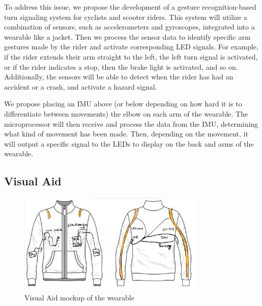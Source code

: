 \documentclass[12pt]{article}
\begin{document}
To address this issue, we propose the development of a gesture 
recognition-based turn signaling system for cyclists and scooter 
riders. This system will utilize a combination of sensors, such 
as accelerometers and gyroscopes, integrated into a wearable 
like a jacket. Then we process the sensor data to identify 
specific arm gestures made by the rider and activate corresponding 
LED signals. For example, if the rider extends their arm straight 
to the left, the left turn signal is activated, or if the rider 
indicates a stop, then the brake light is activated, and so on. 
Additionally, the sensors will be able to detect when the rider 
has had an accident or a crash, and activate a hazard signal. 

We propose placing an IMU above (or below depending on how hard 
it is to differentiate between movements) the elbow on each arm 
of the wearable. The microprocessor will then receive and process 
the data from the IMU, determining what kind of movement has been 
made. Then, depending on the movement, it will output a specific 
signal to the LEDs to display on the back and arms of the wearable. 

\newpage
\subsection{Visual Aid}
\begin{figure}[ht]
    \centering
    \includegraphics[width=0.8\textwidth]{visual_aid.jpg}
    \caption{Visual Aid mockup of the wearable \cite{VectorStock2024}}
    \label{fig:my_label}
\end{figure}
\end{document}
